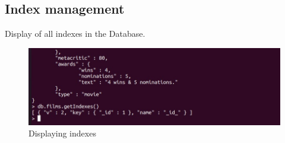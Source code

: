 \begin{spacing}{0.9}
\section{Index management }
\par Display of all indexes in the Database.
\\
\begin{figure}[!htb] 
\begin{center} 
\includegraphics[width=1\linewidth]{Pictures/MongoDB/Examining MongoDB Query Features/Index management/Displaying indexes} 
\end{center} 
\caption{Displaying indexes} 
\end{figure}  \FloatBarrier
\\


\end{spacing}
